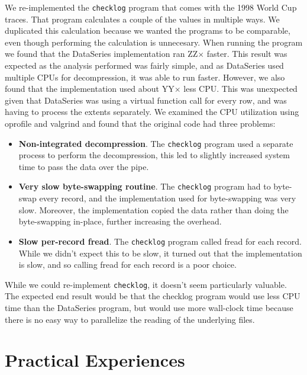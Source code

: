 \documentclass{acm_proc_article-sp}
\begin{document}
We re-implemented the {\tt checklog} program that comes with the 1998
World Cup traces.  That program calculates a couple of the values in
multiple ways.  We duplicated this calculation because we wanted the
programs to be comparable, even though performing the calculation is
unnecesary. When running the program we found that the DataSeries
implementation ran ZZ$\times$ faster.  This result was expected as the
analysis performed was fairly simple, and as DataSeries used multiple
CPUs for decompression, it was able to run faster.  However, we also
found that the implementation used about YY$\times$ less CPU.  This
was unexpected given that DataSeries was using a virtual function call
for every row, and was having to process the extents separately.  We
examined the CPU utilization using oprofile and valgrind and found
that the original code had three problems:

\begin{itemize}

\item {\bf Non-integrated decompression}.  The {\tt checklog} program 
used a separate process to perform the decompression, this led to
slightly increased system time to pass the data over the pipe.

\item {\bf Very slow byte-swapping routine}.  The {\tt checklog} program
had to byte-swap every record, and the implementation used for
byte-swapping was very slow.  Moreover, the implementation copied the
data rather than doing the byte-swapping in-place, further increasing
the overhead.

\item {\bf Slow per-record fread}.  The {\tt checklog} program called 
fread for each record.  While we didn't expect this to be slow, it
turned out that the implementation is slow, and so calling fread for
each record is a poor choice.

\end{itemize}

While we could re-implement {\tt checklog}, it doesn't seem
particularly valuable.  The expected end result would be that the
checklog program would use less CPU time than the DataSeries program,
but would use more wall-clock time because there is no easy way to
parallelize the reading of the underlying files.



\section{Practical Experiences}\label{sec:discussion}
\end{document}
